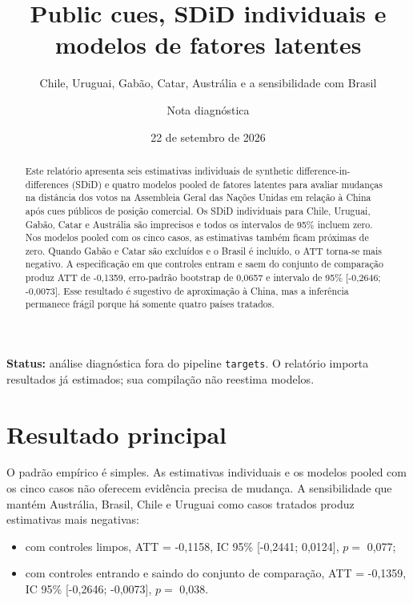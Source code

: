 \documentclass[
  brazilian,
  11pt,
]{article}
\title{Public cues, SDiD individuais e modelos de fatores latentes}
\subtitle{Chile, Uruguai, Gabão, Catar, Austrália e a sensibilidade com
Brasil}
\author{Nota diagnóstica}
\date{22 de setembro de 2026}
\providecommand{\tightlist}{%
  \setlength{\itemsep}{0pt}\setlength{\parskip}{0pt}}
\begin{document}
\maketitle

{
\setcounter{tocdepth}{1}
\tableofcontents
}
\begin{center}
\small\color{darkgray}
\textbf{Status:} análise diagnóstica fora do pipeline \texttt{targets}. O relatório importa resultados já estimados; sua compilação não reestima modelos.
\end{center}

\begin{abstract}
Este relatório apresenta seis estimativas individuais de synthetic difference-in-differences (SDiD) e quatro modelos pooled de fatores latentes para avaliar mudanças na distância dos votos na Assembleia Geral das Nações Unidas em relação à China após cues públicos de posição comercial. Os SDiD individuais para Chile, Uruguai, Gabão, Catar e Austrália são imprecisos e todos os intervalos de 95\% incluem zero. Nos modelos pooled com os cinco casos, as estimativas também ficam próximas de zero. Quando Gabão e Catar são excluídos e o Brasil é incluído, o ATT torna-se mais negativo. A especificação em que controles entram e saem do conjunto de comparação produz ATT de -0,1359, erro-padrão bootstrap de 0,0657 e intervalo de 95\% [-0,2646; -0,0073]. Esse resultado é sugestivo de aproximação à China, mas a inferência permanece frágil porque há somente quatro países tratados.
\end{abstract}

\section{Resultado principal}\label{resultado-principal}

O padrão empírico é simples. As estimativas individuais e os modelos
pooled com os cinco casos não oferecem evidência precisa de mudança. A
sensibilidade que mantém Austrália, Brasil, Chile e Uruguai como casos
tratados produz estimativas mais negativas:

\begin{itemize}
\tightlist
\item
  com controles limpos, ATT = -0,1158, IC 95\% {[}-0,2441; 0,0124{]},
  \(p=\) 0,077;
\item
  com controles entrando e saindo do conjunto de comparação, ATT =
  -0,1359, IC 95\% {[}-0,2646; -0,0073{]}, \(p=\) 0,038.
\end{itemize}
\end{document}
